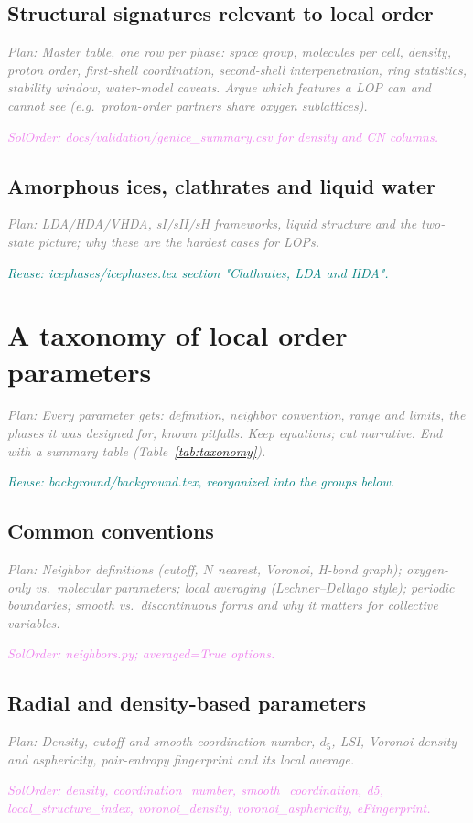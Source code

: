 \documentclass{template1}
\newcommand{\plan}[1]{\par\noindent\textcolor{gray}{\textit{Plan: #1}}\par}
\newcommand{\reuse}[1]{\par\noindent\textcolor{teal}{\textit{Reuse: #1}}\par}
\newcommand{\code}[1]{\par\noindent\textcolor{violet}{\textit{SolOrder: #1}}\par}
\begin{document}
\section{Structural signatures relevant to local order}
\plan{Master table, one row per phase: space group, molecules per cell,
density, proton order, first-shell coordination, second-shell
interpenetration, ring statistics, stability window, water-model caveats.
Argue which features a LOP can and cannot see (e.g.\ proton-order partners
share oxygen sublattices).}
\code{docs/validation/genice\_summary.csv for density and CN columns.}

\section{Amorphous ices, clathrates and liquid water}
\plan{LDA/HDA/VHDA, sI/sII/sH frameworks, liquid structure and the
two-state picture; why these are the hardest cases for LOPs.}
\reuse{icephases/icephases.tex section "Clathrates, LDA and HDA".}

\chapter{A taxonomy of local order parameters}\label{ch:taxonomy}
\plan{Every parameter gets: definition, neighbor convention, range and limits,
the phases it was designed for, known pitfalls. Keep equations; cut
narrative. End with a summary table (Table~\ref{tab:taxonomy}).}
\reuse{background/background.tex, reorganized into the groups below.}

\section{Common conventions}
\plan{Neighbor definitions (cutoff, $N$ nearest, Voronoi, H-bond graph);
oxygen-only vs.\ molecular parameters; local averaging (Lechner--Dellago
style); periodic boundaries; smooth vs.\ discontinuous forms and why it
matters for collective variables.}
\code{neighbors.py; averaged=True options.}

\section{Radial and density-based parameters}
\plan{Density, cutoff and smooth coordination number, $d_5$, LSI, Voronoi
density and asphericity, pair-entropy fingerprint and its local average.}
\code{density, coordination\_number, smooth\_coordination, d5,
local\_structure\_index, voronoi\_density, voronoi\_asphericity,
eFingerprint.}
\end{document}
